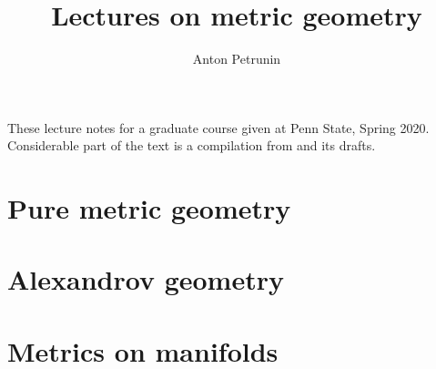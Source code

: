 \documentclass[twoside]{book}
\begin{document}
 
\title{Lectures on metric geometry}
\author{Anton Petrunin}
\date{}
\maketitle

These lecture notes for a graduate course given at Penn State, Spring 2020.
Considerable part of the text is a compilation from \cite{alexander-kapovitch-petrunin-2019, alexander-kapovitch-petrunin-2025, petrunin-yashinski, petrunin-2009, petrunin-zamorabarrera} and its drafts.

\thispagestyle{empty}
\tableofcontents
\thispagestyle{empty}

%
\part{Pure metric geometry}




%


\part{Alexandrov geometry}






\part{Metrics on manifolds}


%
%
%
\appendix


%
{\small\sloppy


\printbibliography[heading=bibintoc]
\fussy
}
\end{document}
